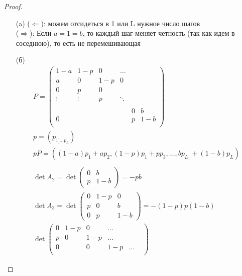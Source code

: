     \begin{proof}
        \begin{itemize}
        \item [(a)]
            ($\Leftarrow$): можем отсидеться в 1 или L нужное число шагов\\
            ($\Rightarrow$): Если $a = 1 = b$, то каждый шаг меняет четность (так как идем в соседнюю), то есть не перемешивающая
        \item [(б)]
            \begin{gather*}
            P =
            \begin{pmatrix}
                1-a & 1-p & 0 & \ldots & &\\
                a & 0 & 1-p & 0 & &\\
                0 & p & 0 & & &\\
                \vdots & \vdots & p & \ddots & & \\
                & & & & &\\
                & & & & 0 & b\\
                0 & & & & p & 1-b\\
            \end{pmatrix}\\
            p = (p_{1] \ldots p_{L}})\\
            pP = \left((1-a)p_{1} + ap_{2}, (1-p)p_{1} + pp_{3}, \ldots, bp_{L_{1}} + (1-b)p_{L}\right)\\
            \\
            \det A_{2}
            = \det 
            \begin{pmatrix}
                0 & b\\
                p & 1-b
            \end{pmatrix}
            = -pb\\
            \det A_{3}
            = \det 
            \begin{pmatrix}
                0 & 1-p & 0\\
                p & 0 & b\\
                0 & p & 1-b
            \end{pmatrix}
            = -(1-p) p (1-b)\\
            \det 
            \begin{pmatrix}
                0 & 1-p & 0 & \ldots & &\\
                p & 0 & 1-p & \ldots & &\\
                0 & & 0 & 1-p & \ldots &\\

\end{pmatrix}
\end{gather*}
\end{itemize}
\end{proof}
